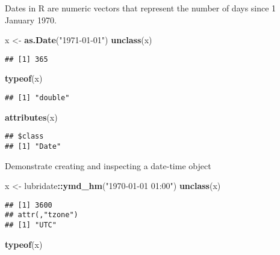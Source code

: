 \documentclass[
]{article}
\newenvironment{Shaded}{\begin{snugshade}}{\end{snugshade}}
\newcommand{\FunctionTok}[1]{\textcolor[rgb]{0.13,0.29,0.53}{\textbf{#1}}}
\newcommand{\NormalTok}[1]{#1}
\newcommand{\OtherTok}[1]{\textcolor[rgb]{0.56,0.35,0.01}{#1}}
\newcommand{\SpecialCharTok}[1]{\textcolor[rgb]{0.81,0.36,0.00}{\textbf{#1}}}
\newcommand{\StringTok}[1]{\textcolor[rgb]{0.31,0.60,0.02}{#1}}
\begin{document}
Dates in R are numeric vectors that represent the number of days since 1
January 1970.

\begin{Shaded}
\begin{Highlighting}[]
\NormalTok{x }\OtherTok{\textless{}{-}} \FunctionTok{as.Date}\NormalTok{(}\StringTok{"1971{-}01{-}01"}\NormalTok{)}
\FunctionTok{unclass}\NormalTok{(x)}
\end{Highlighting}
\end{Shaded}

\begin{verbatim}
## [1] 365
\end{verbatim}

\begin{Shaded}
\begin{Highlighting}[]
\FunctionTok{typeof}\NormalTok{(x)}
\end{Highlighting}
\end{Shaded}

\begin{verbatim}
## [1] "double"
\end{verbatim}

\begin{Shaded}
\begin{Highlighting}[]
\FunctionTok{attributes}\NormalTok{(x)}
\end{Highlighting}
\end{Shaded}

\begin{verbatim}
## $class
## [1] "Date"
\end{verbatim}

Demonstrate creating and inspecting a date-time object

\begin{Shaded}
\begin{Highlighting}[]
\NormalTok{x }\OtherTok{\textless{}{-}}\NormalTok{ lubridate}\SpecialCharTok{::}\FunctionTok{ymd\_hm}\NormalTok{(}\StringTok{"1970{-}01{-}01 01:00"}\NormalTok{)}
\FunctionTok{unclass}\NormalTok{(x)}
\end{Highlighting}
\end{Shaded}

\begin{verbatim}
## [1] 3600
## attr(,"tzone")
## [1] "UTC"
\end{verbatim}

\begin{Shaded}
\begin{Highlighting}[]
\FunctionTok{typeof}\NormalTok{(x)}
\end{Highlighting}
\end{Shaded}
\end{document}
